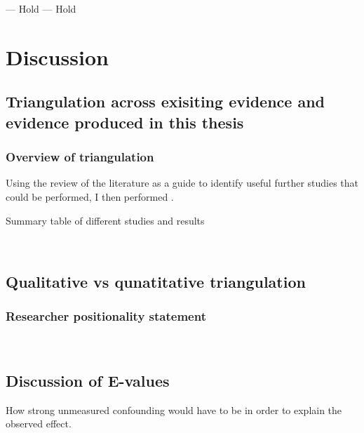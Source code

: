 \documentclass[a4paper, twoside]{templates/ociamthesis}
\begin{document}
--- Hold --- Hold

\hypertarget{discussion-heading}{%
\chapter{Discussion}\label{discussion-heading}}

\minitoc 

\hypertarget{triangulation-across-exisiting-evidence-and-evidence-produced-in-this-thesis}{%
\section{Triangulation across exisiting evidence and evidence produced in this thesis}\label{triangulation-across-exisiting-evidence-and-evidence-produced-in-this-thesis}}

\hypertarget{triangulation-overview}{%
\subsection{Overview of triangulation}\label{triangulation-overview}}

Using the review of the literature as a guide to identify useful further studies that could be performed, I then performed .

Summary table of different studies and results

~

\hypertarget{qualitative-vs-qunatitative-triangulation}{%
\section{Qualitative vs qunatitative triangulation}\label{qualitative-vs-qunatitative-triangulation}}

\hypertarget{researcher-positionality-statement}{%
\subsection{Researcher positionality statement}\label{researcher-positionality-statement}}

~

\hypertarget{discussion-of-e-values}{%
\section{Discussion of E-values}\label{discussion-of-e-values}}

How strong unmeasured confounding would have to be in order to explain the observed effect.
\end{document}
